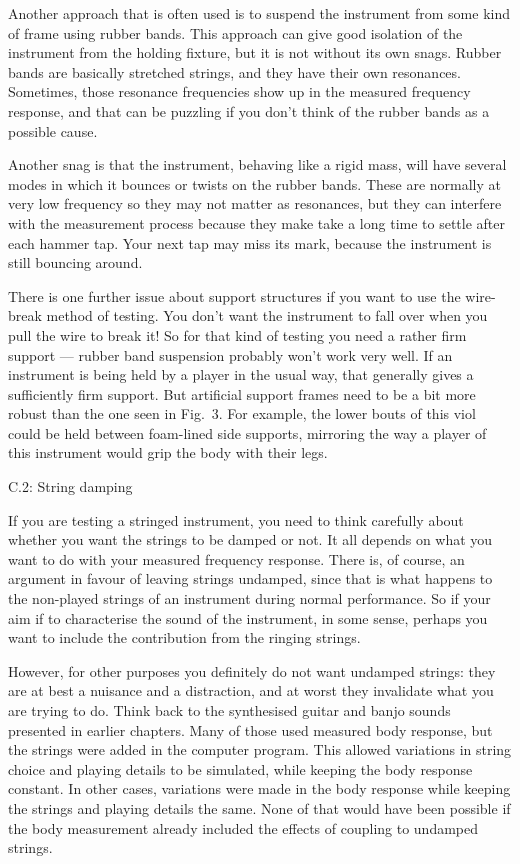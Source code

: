   Another approach that is often used is to suspend the instrument from some 
  kind of frame using rubber bands. This approach can give good isolation of 
  the instrument from the holding fixture, but it is not without its own snags. 
  Rubber bands are basically stretched strings, and they have their own 
  resonances. Sometimes, those resonance frequencies show up in the measured 
  frequency response, and that can be puzzling if you don't think of the rubber 
  bands as a possible cause. 

  Another snag is that the instrument, behaving like a rigid mass, will have 
  several modes in which it bounces or twists on the rubber bands. These are 
  normally at very low frequency so they may not matter as resonances, but they 
  can interfere with the measurement process because they make take a long time 
  to settle after each hammer tap. Your next tap may miss its mark, because the 
  instrument is still bouncing around. 

  There is one further issue about support structures if you want to use the 
  wire-break method of testing. You don't want the instrument to fall over when 
  you pull the wire to break it! So for that kind of testing you need a rather 
  firm support --- rubber band suspension probably won't work very well. If an 
  instrument is being held by a player in the usual way, that generally gives a 
  sufficiently firm support. But artificial support frames need to be a bit 
  more robust than the one seen in Fig.\ 3. For example, the lower bouts of 
  this viol could be held between foam-lined side supports, mirroring the way a 
  player of this instrument would grip the body with their legs. 

  C.2: String damping 

  If you are testing a stringed instrument, you need to think carefully about 
  whether you want the strings to be damped or not. It all depends on what you 
  want to do with your measured frequency response. There is, of course, an 
  argument in favour of leaving strings undamped, since that is what happens to 
  the non-played strings of an instrument during normal performance. So if your 
  aim if to characterise the sound of the instrument, in some sense, perhaps 
  you want to include the contribution from the ringing strings. 

  However, for other purposes you definitely do not want undamped strings: they 
  are at best a nuisance and a distraction, and at worst they invalidate what 
  you are trying to do. Think back to the synthesised guitar and banjo sounds 
  presented in earlier chapters. Many of those used measured body response, but 
  the strings were added in the computer program. This allowed variations in 
  string choice and playing details to be simulated, while keeping the body 
  response constant. In other cases, variations were made in the body response 
  while keeping the strings and playing details the same. None of that would 
  have been possible if the body measurement already included the effects of 
  coupling to undamped strings. 

